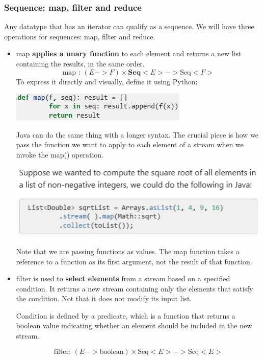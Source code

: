 \documentclass[letterpaper,12pt]{article}
\begin{document}
\subsubsection{Sequence: map, filter and reduce}
Any datatype that has an iterator can qualify as a sequence. We will have three operations for sequences: map, filter and reduce.
\begin{itemize}
      \item map \textbf{applies a unary function} to each element and returns a new list containing the results, in the same order.
            \[\text{map : }(E->F)\times \textbf{Seq}<E>->\text{Seq}<F>\]
            To express it directly and visually, define it using Python:

            \includegraphics*{summary_image/Map def.jpg}

            Java can do the same thing with a longer syntax. The crucial piece is how we pass the function we want to apply to each element of a stream when we invoke the map() operation.

            \includegraphics*[scale=0.95]{summary_image/Map java example.jpg}

            Note that we are passing functions as values. The map function takes a reference to a function as its first argument, not the result of that function.

      \item filter is used to \textbf{select elements} from a stream based on a specified condition. It returns a new stream containing only the elements that satisfy the condition. Not that it does not modify its input list.

            Condition is defined by a predicate, which is a function that returns a boolean value indicating whether an element should be included in the new stream.

            \[\text{filter: } (E->\text{boolean}) \times \text{Seq}<E> -> \text{Seq}<E>\]


\end{itemize}
\end{document}
